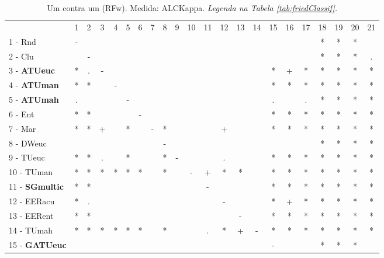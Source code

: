 \begin{table}[h]
\caption{Um contra um (RFw). Medida: ALCKappa. \textit{Legenda na Tabela \ref{tab:friedClassif}.}}
\begin{center}\begin{tabular}{lcc|cc|cc|cc|cc|cc|cc|cc|cc|cc|c}
 			& 1 & 2 & 3 & 4 & 5 & 6 & 7 & 8 & 9 & 10 & 11 & 12 & 13 & 14 & 15 & 16 & 17 & 18 & 19 & 20 & 21\\
1 - Rnd  	& - &   &   &   &   &   &   &   &   &   &   &   &   &   &   &   &   & * & * & * &   \\
2 - Clu  	&   & - &   &   &   &   &   &   &   &   &   &   &   &   &   &   &   & * & * & * & . \\ \hline
3 - \textbf{ATUeuc}	& * & . & - &   &   &   &   &   &   &   &   &   &   &   & * & + & * & * & * & * & * \\
4 - \textbf{ATUman}	& * & * &   & - &   &   &   &   &   &   &   &   &   &   & * & * & * & * & * & * & * \\ \hline
5 - \textbf{ATUmah}	& . &   &   &   & - &   &   &   &   &   &   &   &   &   & . &   & . & * & * & * & * \\
6 - Ent  	& * & * &   &   &   & - &   &   &   &   &   &   &   &   & * & * & * & * & * & * & * \\ \hline
7 - Mar  	& * & * & + &   & * &   & - & * &   &   &   & + &   &   & * & * & * & * & * & * & * \\
8 - DWeuc	&   &   &   &   &   &   &   & - &   &   &   &   &   &   &   &   &   & * & * & * & * \\ \hline
9 - TUeuc	& * & * & . &   & * &   &   & * & - &   &   & . &   &   & * & * & * & * & * & * & * \\
10 - TUman	& * & * & * & * & * & * &   & * &   & - & + & * & * &   & * & * & * & * & * & * & * \\ \hline
11 - \textbf{SGmultic}	& * & * &   &   &   &   &   &   &   &   & - &   &   &   & * & * & * & * & * & * & * \\
12 - EERacu	& * & . &   &   &   &   &   &   &   &   &   & - &   &   & * & + & * & * & * & * & * \\ \hline
13 - EERent	& * & * &   &   &   &   &   &   &   &   &   &   & - &   & * & * & * & * & * & * & * \\
14 - TUmah	& * & * & * & * & * & * &   & * &   &   & . & * & + & - & * & * & * & * & * & * & * \\ \hline
15 - \textbf{GATUeuc}	&   &   &   &   &   &   &   &   &   &   &   &   &   &   & - &   &   & * & * & * &   \\

\end{tabular}
\end{center}
\end{table}
